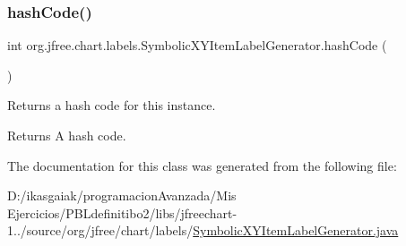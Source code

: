 \mbox{\label{classorg_1_1jfree_1_1chart_1_1labels_1_1_symbolic_x_y_item_label_generator_a379926e2c13762e0f2c798d7e43ebc71}} 
\subsubsection{\texorpdfstring{hash\+Code()}{hashCode()}}
{\footnotesize\ttfamily int org.\+jfree.\+chart.\+labels.\+Symbolic\+X\+Y\+Item\+Label\+Generator.\+hash\+Code (\begin{DoxyParamCaption}{ }\end{DoxyParamCaption})}

Returns a hash code for this instance.

\begin{DoxyReturn}{Returns}
A hash code. 
\end{DoxyReturn}


The documentation for this class was generated from the following file\+:\begin{DoxyCompactItemize}
\item 
D\+:/ikasgaiak/programacion\+Avanzada/\+Mis Ejercicios/\+P\+B\+Ldefinitibo2/libs/jfreechart-\/1../source/org/jfree/chart/labels/\mbox{\hyperlink{_symbolic_x_y_item_label_generator_8java}{Symbolic\+X\+Y\+Item\+Label\+Generator.\+java}}\end{DoxyCompactItemize}
